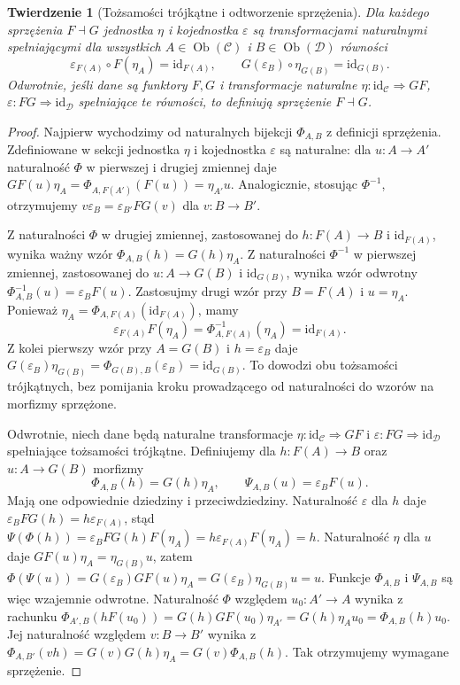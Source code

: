 \documentclass[11pt,a4paper]{article}
\numberwithin{equation}{section}
\theoremstyle{plain}
\newtheorem{twierdzenie}{Twierdzenie}[section]
\theoremstyle{definition}
\theoremstyle{remark}
\newcommand{\id}{\mathrm{id}}
\newcommand{\Ob}{\operatorname{Ob}}
\begin{document}
\begin{twierdzenie}[Tożsamości trójkątne i odtworzenie sprzężenia]\label{tw:triangles}
Dla każdego sprzężenia $F\dashv G$ jednostka $\eta$ i kojednostka $\varepsilon$ są transformacjami naturalnymi spełniającymi dla wszystkich $A\in\Ob(\mathcal C)$ i $B\in\Ob(\mathcal D)$ równości
\[
\varepsilon_{F(A)}\circ F(\eta_A)=\id_{F(A)},\qquad G(\varepsilon_B)\circ\eta_{G(B)}=\id_{G(B)}.
\]
Odwrotnie, jeśli dane są funktory $F,G$ i transformacje naturalne $\eta:\id_{\mathcal C}\Rightarrow GF$, $\varepsilon:FG\Rightarrow\id_{\mathcal D}$ spełniające te równości, to definiują sprzężenie $F\dashv G$.
\end{twierdzenie}
\begin{proof}
Najpierw wychodzimy od naturalnych bijekcji $\Phi_{A,B}$ z definicji sprzężenia. Zdefiniowane w sekcji jednostka $\eta$ i kojednostka $\varepsilon$ są naturalne: dla $u:A\to A'$ naturalność $\Phi$ w pierwszej i drugiej zmiennej daje
$GF(u)\eta_A=\Phi_{A,F(A')}(F(u))=\eta_{A'}u$. Analogicznie, stosując $\Phi^{-1}$, otrzymujemy $v\varepsilon_B=\varepsilon_{B'}FG(v)$ dla $v:B\to B'$.

Z naturalności $\Phi$ w drugiej zmiennej, zastosowanej do $h:F(A)\to B$ i $\id_{F(A)}$, wynika ważny wzór
$\Phi_{A,B}(h)=G(h)\eta_A$.
Z naturalności $\Phi^{-1}$ w pierwszej zmiennej, zastosowanej do $u:A\to G(B)$ i $\id_{G(B)}$, wynika wzór odwrotny
$\Phi_{A,B}^{-1}(u)=\varepsilon_BF(u)$.
Zastosujmy drugi wzór przy $B=F(A)$ i $u=\eta_A$. Ponieważ $\eta_A=\Phi_{A,F(A)}(\id_{F(A)})$, mamy
\[
\varepsilon_{F(A)}F(\eta_A)
=\Phi_{A,F(A)}^{-1}(\eta_A)=\id_{F(A)}.
\]
Z kolei pierwszy wzór przy $A=G(B)$ i $h=\varepsilon_B$ daje
$G(\varepsilon_B)\eta_{G(B)}=\Phi_{G(B),B}(\varepsilon_B)=\id_{G(B)}$.
To dowodzi obu tożsamości trójkątnych, bez pomijania kroku prowadzącego od naturalności do wzorów na morfizmy sprzężone.

Odwrotnie, niech dane będą naturalne transformacje $\eta:\id_{\mathcal C}\Rightarrow GF$ i $\varepsilon:FG\Rightarrow\id_{\mathcal D}$ spełniające tożsamości trójkątne. Definiujemy dla $h:F(A)\to B$ oraz $u:A\to G(B)$ morfizmy
\[
\Phi_{A,B}(h)=G(h)\eta_A,\qquad
\Psi_{A,B}(u)=\varepsilon_BF(u).
\]
Mają one odpowiednie dziedziny i przeciwdziedziny. Naturalność $\varepsilon$ dla $h$ daje $\varepsilon_BFG(h)=h\varepsilon_{F(A)}$, stąd
$\Psi(\Phi(h))=\varepsilon_BFG(h)F(\eta_A)=h\varepsilon_{F(A)}F(\eta_A)=h$.
Naturalność $\eta$ dla $u$ daje $GF(u)\eta_A=\eta_{G(B)}u$, zatem
$\Phi(\Psi(u))=G(\varepsilon_B)GF(u)\eta_A=G(\varepsilon_B)\eta_{G(B)}u=u$.
Funkcje $\Phi_{A,B}$ i $\Psi_{A,B}$ są więc wzajemnie odwrotne. Naturalność $\Phi$ względem $u_0:A'\to A$ wynika z rachunku
$\Phi_{A',B}(hF(u_0))=G(h)GF(u_0)\eta_{A'}=G(h)\eta_Au_0=\Phi_{A,B}(h)u_0$.
Jej naturalność względem $v:B\to B'$ wynika z $\Phi_{A,B'}(vh)=G(v)G(h)\eta_A=G(v)\Phi_{A,B}(h)$. Tak otrzymujemy wymagane sprzężenie.
\end{proof}
\end{document}
